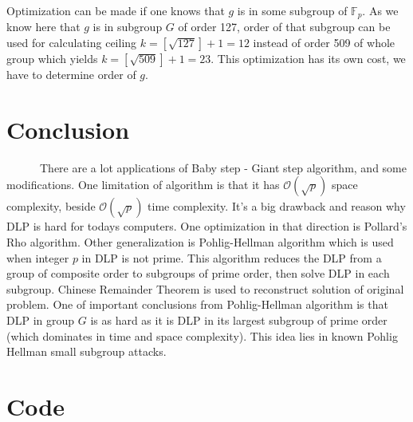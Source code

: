 \documentclass[fleqn,10pt]{olplainarticle}
\begin{document}
Optimization can be made if one knows that $g$ is in some 
subgroup of $\mathbb{F}_p$. As we know here that $g$ is in 
subgroup $G$ of order 127, order of that subgroup can be used 
for calculating ceiling $k=[\sqrt{127}]+1=12$ instead of order 
509 of whole group which yields $k=[\sqrt{509}]+1=23$. 
This optimization has its own cost, we have to determine order 
of $g$.

\section*{Conclusion}

\par \ \ \ \ \ \ There are a lot applications of Baby step - Giant step algorithm, 
and some modifications. One limitation of algorithm is that it 
has $\mathcal{O}(\sqrt{p})$ space complexity, beside 
$\mathcal{O}(\sqrt{p})$ time complexity. It's a big drawback and 
reason why DLP is hard for todays computers. One optimization 
in that direction is Pollard's Rho algorithm. Other 
generalization is Pohlig-Hellman algorithm which is used when 
integer $p$ in DLP is not prime. This algorithm reduces the DLP 
from a group of composite order to subgroups of prime order, 
then solve DLP in each subgroup. Chinese Remainder Theorem is 
used to reconstruct solution of original problem. One of 
important conclusions from Pohlig-Hellman algorithm is that DLP 
in group $G$ is as hard as it is DLP in its largest subgroup of 
prime order (which dominates in time and space complexity). 
This idea lies in known Pohlig Hellman small subgroup attacks.
\section*{Code}
\end{document}

